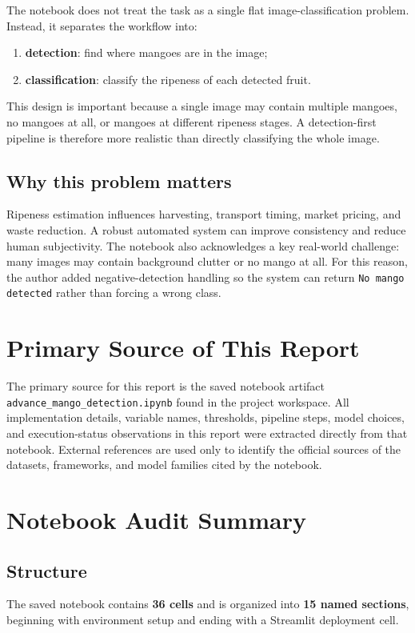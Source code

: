 \documentclass[12pt,a4paper]{article}
\begin{document}
The notebook does not treat the task as a single flat image-classification problem. Instead, it separates the workflow into:
\begin{enumerate}
    \item \textbf{detection}: find where mangoes are in the image;
    \item \textbf{classification}: classify the ripeness of each detected fruit.
\end{enumerate}

This design is important because a single image may contain multiple mangoes, no mangoes at all, or mangoes at different ripeness stages. A detection-first pipeline is therefore more realistic than directly classifying the whole image.

\subsection{Why this problem matters}
Ripeness estimation influences harvesting, transport timing, market pricing, and waste reduction. A robust automated system can improve consistency and reduce human subjectivity. The notebook also acknowledges a key real-world challenge: many images may contain background clutter or no mango at all. For this reason, the author added negative-detection handling so the system can return \texttt{No mango detected} rather than forcing a wrong class.

\section{Primary Source of This Report}
The primary source for this report is the saved notebook artifact \texttt{advance\_mango\_detection.ipynb} found in the project workspace. All implementation details, variable names, thresholds, pipeline steps, model choices, and execution-status observations in this report were extracted directly from that notebook. External references are used only to identify the official sources of the datasets, frameworks, and model families cited by the notebook.

\section{Notebook Audit Summary}
\subsection{Structure}
The saved notebook contains \textbf{36 cells} and is organized into \textbf{15 named sections}, beginning with environment setup and ending with a Streamlit deployment cell.
\end{document}
